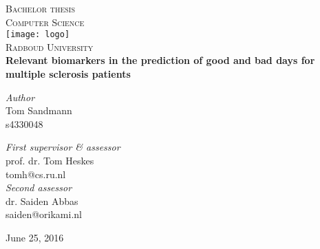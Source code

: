 \begin{titlepage}
	\begin{center}
		\textsc{\LARGE Bachelor thesis\\Computer Science}\\[1.5cm]
		\texttt{[image: logo]}\\
		\vspace{0.4cm}
		\textsc{\Large Radboud University}\\[1cm]
		\vspace{0.4cm}
		\textbf{\huge Relevant biomarkers in the prediction of good and bad days for multiple sclerosis patients}\\[0.4cm]
		\vspace{2cm}
		\begin{minipage}[t]{0.45\textwidth}
			\begin{flushleft} \large
				\textit{Author}\\
				Tom Sandmann\\
				s4330048
			\end{flushleft}
		\end{minipage}
		\begin{minipage}[t]{0.45\textwidth}
			\begin{flushright} \large
				\textit{First supervisor \& assessor}\\
				prof. dr. Tom Heskes\\
				tomh@cs.ru.nl\\[1.3cm]
				\textit{Second assessor}\\
				dr. Saiden Abbas\\
				saiden@orikami.nl
			\end{flushright}
		\end{minipage}
		\vfill
		{\large June 25, 2016}
	\end{center}
\end{titlepage}

